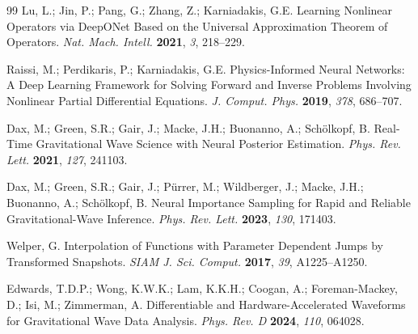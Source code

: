 \documentclass[11pt, a4paper]{article}
\begin{document}
\begin{thebibliography}{99}
Lu, L.; Jin, P.; Pang, G.; Zhang, Z.; Karniadakis, G.E. Learning Nonlinear Operators via DeepONet Based on the Universal Approximation Theorem of Operators. \textit{Nat. Mach. Intell.} \textbf{2021}, \textit{3}, 218--229.

Raissi, M.; Perdikaris, P.; Karniadakis, G.E. Physics-Informed Neural Networks: A Deep Learning Framework for Solving Forward and Inverse Problems Involving Nonlinear Partial Differential Equations. \textit{J. Comput. Phys.} \textbf{2019}, \textit{378}, 686--707.

Dax, M.; Green, S.R.; Gair, J.; Macke, J.H.; Buonanno, A.; Sch\"olkopf, B. Real-Time Gravitational Wave Science with Neural Posterior Estimation. \textit{Phys. Rev. Lett.} \textbf{2021}, \textit{127}, 241103.

Dax, M.; Green, S.R.; Gair, J.; P\"urrer, M.; Wildberger, J.; Macke, J.H.; Buonanno, A.; Sch\"olkopf, B. Neural Importance Sampling for Rapid and Reliable Gravitational-Wave Inference. \textit{Phys. Rev. Lett.} \textbf{2023}, \textit{130}, 171403.

Welper, G. Interpolation of Functions with Parameter Dependent Jumps by Transformed Snapshots. \textit{SIAM J. Sci. Comput.} \textbf{2017}, \textit{39}, A1225--A1250.

Edwards, T.D.P.; Wong, K.W.K.; Lam, K.K.H.; Coogan, A.; Foreman-Mackey, D.; Isi, M.; Zimmerman, A. Differentiable and Hardware-Accelerated Waveforms for Gravitational Wave Data Analysis. \textit{Phys. Rev. D} \textbf{2024}, \textit{110}, 064028.

\end{thebibliography}
\end{document}
